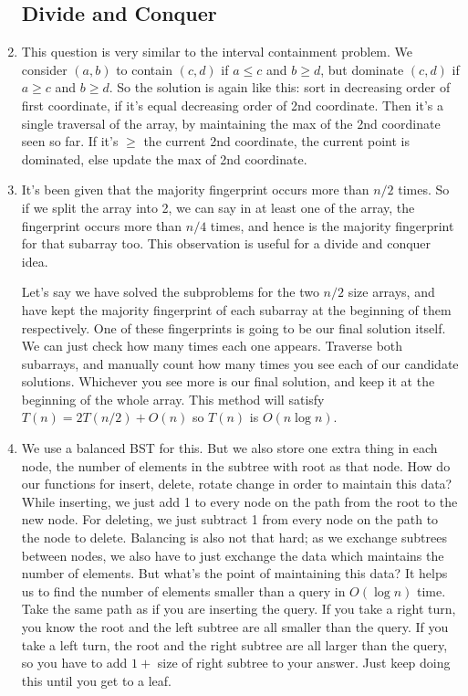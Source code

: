 \documentclass[12pt]{report}
\begin{document}
\begin{enumerate}[label=\textbf{\arabic*.}]
  \subsection*{\huge\bfseries Divide and Conquer}

  \item This question is very similar to the interval containment problem. We consider $(a, b)$ to contain $(c, d)$ if $a \leq c$
  and $b \geq d$, but dominate $(c, d)$ if $a \geq c$ and $b \geq d$. So the solution is again like this: sort in decreasing order 
  of first coordinate, if it's equal decreasing order of 2nd coordinate. Then it's a single traversal of the array, by maintaining 
  the max of the 2nd coordinate seen so far. If it's $\geq$ the current 2nd coordinate, the current point is dominated, else update the 
  max of 2nd coordinate.

  \item It's been given that the majority fingerprint occurs more than $n/2$ times. So if we split the array into 2, we
  can say in at least one of the array, the fingerprint occurs more than $n/4$ times, and hence is the majority fingerprint for 
  that subarray too. This observation is useful for a divide and conquer idea.

  Let's say we have solved the subproblems for the two $n/2$ size arrays, and have kept the majority fingerprint of each subarray
  at the beginning of them respectively. One of these fingerprints is going to be our final solution itself. We can just check how 
  many times each one appears. Traverse both subarrays, and manually count how many times you see each of our candidate solutions.
  Whichever you see more is our final solution, and keep it at the beginning of the whole array. This method will satisfy 
  $T(n) = 2T(n/2) + O(n)$ so $T(n)$ is $O(n \log n)$.

  \item We use a balanced BST for this. But we also store one extra thing in each node, the number of elements in the subtree with
  root as that node. How do our functions for insert, delete, rotate change in order to maintain this data? While inserting, we just 
  add 1 to every node on the path from the root to the new node. For deleting, we just subtract 1 from every node on the path to the
  node to delete. Balancing is also not that hard; as we exchange subtrees between nodes, we also have to just exchange the data
  which maintains the number of elements. But what's the point of maintaining this data? It helps us to find the number of elements 
  smaller than a query in $O(\log n)$ time. Take the same path as if you are inserting the query. If you take a right turn, you know the 
  root and the left subtree are all smaller than the query. If you take a left turn, the root and the right subtree are all larger than 
  the query, so you have to add $1 + $ size of right subtree to your answer. Just keep doing this until you get to a leaf.


\end{enumerate}
\end{document}
